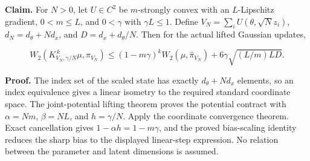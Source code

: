 \documentclass[11pt,a4paper]{article}
\begin{document}
\textbf{Claim.} For \(N>0\), let \(U\in C^2\) be \(m\)-strongly convex with an \(L\)-Lipschitz gradient, \(0<m\le L\), and \(0<\gamma\) with \(\gamma L\le1\). Define \(V_N=\sum_iU(\theta,\sqrt N z_i)\), \(d_N=d_\theta+Nd_x\), and \(D=d_x+d_\theta/N\). Then for the actual lifted Gaussian updates,

\[W_2(K_{V_N,\gamma/N}^{\,k}\mu,\pi_{V_N})\le(1-m\gamma)^kW_2(\mu,\widehat\pi_{V_N})+6\gamma\sqrt{(L/m)LD}.\]


\textbf{Proof.} The index set of the scaled state has exactly \(d_\theta+Nd_x\) elements, so an index equivalence gives a linear isometry to the required standard coordinate space. The joint-potential lifting theorem proves the potential contract with \(\alpha=Nm\), \(\beta=NL\), and \(h=\gamma/N\). Apply the coordinate convergence theorem. Exact cancellation gives \(1-\alpha h=1-m\gamma\), and the proved bias-scaling identity reduces the sharp bias to the displayed linear-step expression. No relation between the parameter and latent dimensions is assumed.
\end{document}
